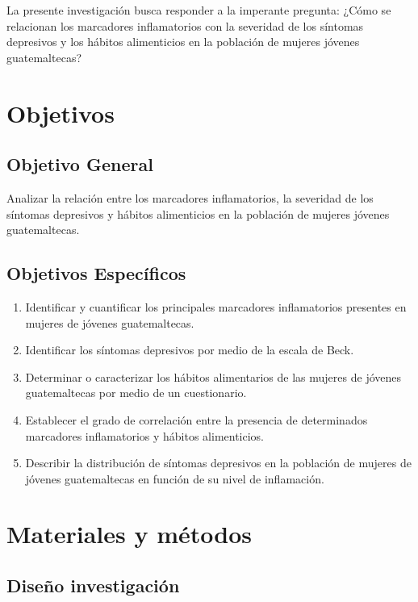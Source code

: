 \documentclass[man]{apa7}
\begin{document}
	La presente investigación busca responder a la imperante pregunta: ¿Cómo
	se relacionan los marcadores inflamatorios con la severidad de los
	síntomas depresivos y los hábitos alimenticios en la población de
	mujeres jóvenes guatemaltecas?

	\section{Objetivos}\label{objetivos}

	\subsection{Objetivo General}\label{objetivo-general}

	Analizar la relación entre los marcadores inflamatorios, la severidad de
	los síntomas depresivos y hábitos alimenticios en la población de
	mujeres jóvenes guatemaltecas.

	\subsection{Objetivos Específicos}\label{objetivos-especuxedficos}

	\begin{enumerate}
		\item Identificar y cuantificar los principales marcadores inflamatorios presentes en mujeres de jóvenes guatemaltecas.
		\item Identificar los síntomas depresivos por medio de la escala de Beck.
		\item Determinar o caracterizar los hábitos alimentarios de las mujeres de jóvenes guatemaltecas por medio de un cuestionario.
		\item Establecer el grado de correlación entre la presencia de determinados marcadores inflamatorios y hábitos alimenticios.
		\item Describir la distribución de síntomas depresivos en la población de mujeres de jóvenes guatemaltecas en función de su nivel de inflamación.
	\end{enumerate}


	\section{Materiales y métodos}\label{materiales-y-muxe9todos}

	\subsection{Diseño investigación}\label{diseuxf1o-investigaciuxf3n}
\end{document}
